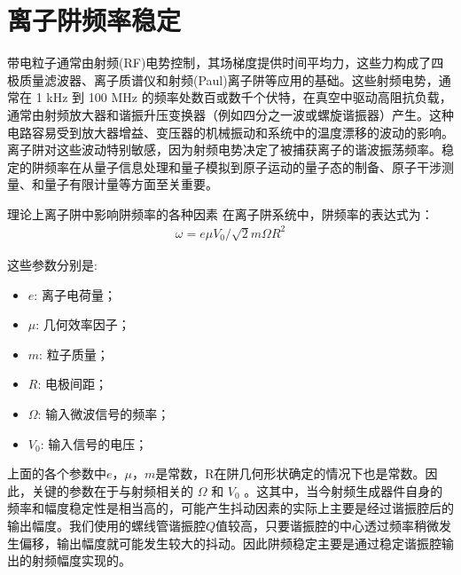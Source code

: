 
\chapter[离子阱频率稳定]{离子阱频率稳定\label{section:trap_frequency_stablization}}


带电粒子通常由射频(RF)电势控制，其场梯度提供时间平均力，这些力构成了四极质量滤波器、离子质谱仪和射频(Paul)离子阱等应用的基础\cite[]{Dehmelt_1990, Paul_1990}。这些射频电势，通常在 1 kHz 到 100 MHz 的频率处数百或数千个伏特，在真空中驱动高阻抗负载，通常由射频放大器和谐振升压变换器（例如四分之一波或螺旋谐振器）产生\cite[]{Siverns_Simkins_Weidt_Hensinger_2012}。这种电路容易受到放大器增益、变压器的机械振动和系统中的温度漂移的波动的影响。离子阱对这些波动特别敏感，因为射频电势决定了被捕获离子的谐波振荡频率。稳定的阱频率在从量子信息处理\cite[]{Blatt_Wineland_2008, Monroe_Kim_2013}和量子模拟\cite[]{Richerme_Gong_Lee_Senko_Smith_Foss_Feig_Michalakis_Gorshkov_Monroe_2014, Jurcevic_Lanyon_Hauke_Hempel_Zoller_Blatt_Roos_2014}到原子运动的量子态的制备\cite[]{Leibfried_Blatt_Monroe_Wineland_2003}、原子干涉测量\cite[]{Johnson_Neyenhuis_Mizrahi_Wong_Campos_Monroe_2015}、和量子有限计量\cite[]{Chou_Hume_Koelemeij_Wineland_Rosenband_2010}等方面至关重要。


理论上离子阱中影响阱频率的各种因素
在离子阱系统中，阱频率的表达式为：
\begin{align}
    \omega=e\mu V_0/\sqrt{2}m\Omega R^2
\end{align}

这些参数分别是:
\begin{itemize}
    \item $e$: 离子电荷量；
    \item $\mu$: 几何效率因子；
    \item $m$: 粒子质量；
    \item $R$: 电极间距；
    \item $\Omega$: 输入微波信号的频率；
    \item $V_0$: 输入信号的电压；
\end{itemize}


上面的各个参数中$e$，$\mu$，$m$是常数，R在阱几何形状确定的情况下也是常数。因此，关键的参数在于与射频相关的 $\Omega$ 和 $V_0$ 。这其中，当今射频生成器件自身的频率和幅度稳定性是相当高的，可能产生抖动因素的实际上主要是经过谐振腔后的输出幅度。我们使用的螺线管谐振腔$Q$值较高，只要谐振腔的中心透过频率稍微发生偏移，输出幅度就可能发生较大的抖动。因此阱频稳定主要是通过稳定谐振腔输出的射频幅度实现的。


